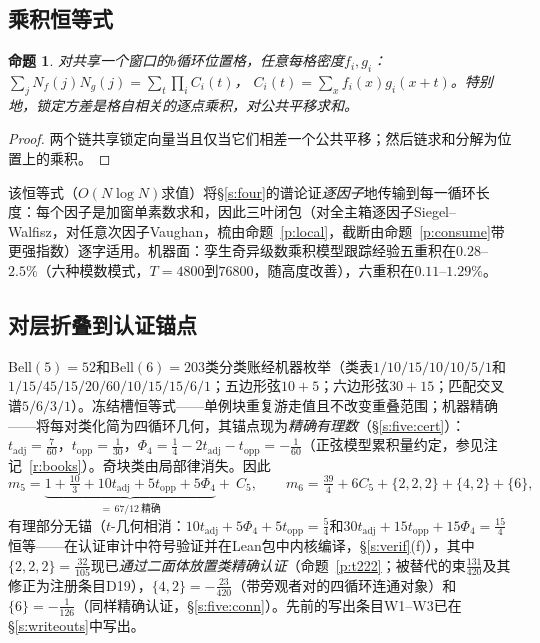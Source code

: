 \documentclass[11pt]{article}
\numberwithin{equation}{section}
\newtheorem{proposition}[theorem]{命题}
\theoremstyle{definition}
\theoremstyle{remark}
\begin{document}
\subsection{乘积恒等式}

\begin{proposition}\label{p:prod}
对共享一个窗口的$b$循环位置格，任意每格密度$f_i,g_i$：
$\sum_jN_f(j)N_g(j)=\sum_t\prod_iC_i(t)$，
$C_i(t)=\sum_xf_i(x)g_i(x+t)$。特别地，锁定方差是格自相关的逐点乘积，对公共平移求和。
\end{proposition}

\begin{proof}
两个链共享锁定向量当且仅当它们相差一个公共平移；然后链求和分解为位置上的乘积。
\end{proof}

该恒等式（$O(N\log N)$求值）将\S\ref{s:four}的谱论证\emph{逐因子}地传输到每一循环长度：每个因子是加窗单素数求和，因此三叶闭包（对全主箱逐因子Siegel--Walfisz，对任意次因子Vaughan，梳由命题~\ref{p:local}，截断由命题~\ref{p:consume}带更强指数）逐字适用。机器面：孪生奇异级数乘积模型跟踪经验五重积在$0.28$--$2.5\%$（六种模数模式，$T=4800$到$76800$，随高度改善），六重积在$0.11$--$1.29\%$。

\subsection{对层折叠到认证锚点}

Bell$(5)=52$和Bell$(6)=203$类分类账经机器枚举（类表$1/10/15 /10/10/5/1$和$1/15/45/15/20/60/10/15/15/6/1$；五边形弦$10+5$；六边形弦$30+15$；匹配交叉谱$5/6/3/1$）。冻结槽恒等式——单例块重复游走值且不改变重叠范围；机器精确——将每对类化简为四循环几何，其锚点现为\emph{精确有理数}（\S\ref{s:five:cert}）：$t_{\mathrm{adj}}=\tfrac7{60}$，$t_{\mathrm{opp}}=\tfrac1{30}$，$\Phi_4=\tfrac14-2t_{\mathrm{adj}}-t_{\mathrm{opp}}=-\tfrac1{60}$（正弦模型累积量约定，参见注记~\ref{r:books}）。奇块类由局部律消失。因此
\[
m_5=\underbrace{1+\tfrac{10}3+10t_{\mathrm{adj}}
+5t_{\mathrm{opp}}+5\Phi_4}_{=\,67/12\ \text{精确}}+\ C_5,
\qquad
m_6=\tfrac{39}4+6C_5+\{2,2,2\}+\{4,2\}+\{6\},
\]
有理部分无锚（$t$-几何相消：$10t_{\mathrm{adj}}+5\Phi_4+5t_{\mathrm{opp}}=\tfrac54$和$30t_{\mathrm{adj}}+15t_{\mathrm{opp}}+15\Phi_4=\tfrac{15}4$恒等——在认证审计中符号验证并在Lean包中内核编译，\S\ref{s:verif}(f)），其中$\{2,2,2\}=\tfrac{32}{105}$现已\emph{通过二面体放置类精确认证}（命题~\ref{p:t222}；被替代的束$\tfrac{131}{420}$及其修正为注册条目D19），$\{4,2\}=-\tfrac{23}{420}$（带旁观者对的四循环连通对象）和$\{6\}=-\tfrac1{126}$（同样精确认证，\S\ref{s:five:conn}）。先前的写出条目W1--W3已在\S\ref{s:writeouts}中写出。
\end{document}
